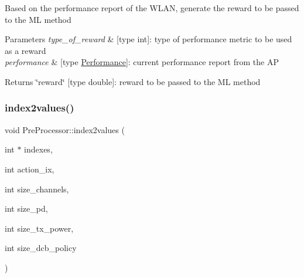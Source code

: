 Based on the performance report of the W\+L\+AN, generate the reward to be passed to the ML method 
\begin{DoxyParams}{Parameters}
{\em type\+\_\+of\+\_\+reward} & \mbox{[}type int\mbox{]}\+: type of performance metric to be used as a reward \\
\hline
{\em performance} & \mbox{[}type \hyperlink{structPerformance}{Performance}\mbox{]}\+: current performance report from the AP \\
\hline
\end{DoxyParams}
\begin{DoxyReturn}{Returns}
\char`\"{}reward\char`\"{} \mbox{[}type double\mbox{]}\+: reward to be passed to the ML method 
\end{DoxyReturn}
\mbox{\label{classPreProcessor_a11800dabafafd6de4cd1129ebb56cab2}} 
\subsubsection{\texorpdfstring{index2values()}{index2values()}}
{\footnotesize\ttfamily void Pre\+Processor\+::index2values (\begin{DoxyParamCaption}\item[{int $\ast$}]{indexes,  }\item[{int}]{action\+\_\+ix,  }\item[{int}]{size\+\_\+channels,  }\item[{int}]{size\+\_\+pd,  }\item[{int}]{size\+\_\+tx\+\_\+power,  }\item[{int}]{size\+\_\+dcb\+\_\+policy }\end{DoxyParamCaption})\hspace{0.3cm}{\ttfamily [inline]}}

